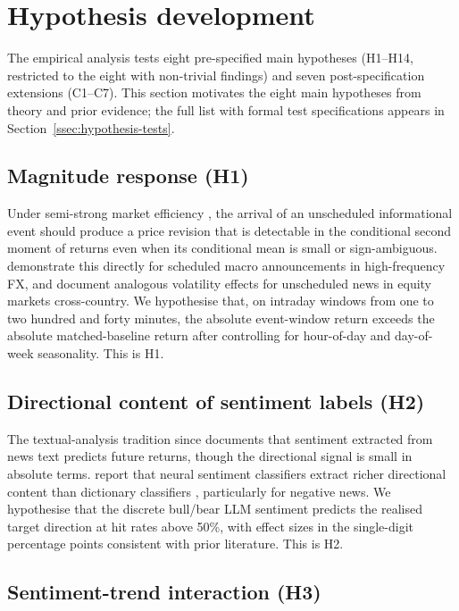 \section{Hypothesis development}
\label{sec:hypotheses}

The empirical analysis tests eight pre-specified main hypotheses
(H1--H14, restricted to the eight with non-trivial findings) and
seven post-specification extensions (C1--C7). This section motivates
the eight main hypotheses from theory and prior evidence; the full
list with formal test specifications appears in
Section~\ref{ssec:hypothesis-tests}.

\subsection{Magnitude response (H1)}

Under semi-strong market efficiency \citep{fama1970efficient}, the
arrival of an unscheduled informational event should produce a
price revision that is detectable in the conditional second moment
of returns even when its conditional mean is small or sign-ambiguous.
\citet{andersen2003micro} demonstrate this directly for scheduled
macro announcements in high-frequency FX, and
\citet{calomiris2019news} document analogous volatility effects for
unscheduled news in equity markets cross-country. We hypothesise
that, on intraday windows from one to two hundred and forty
minutes, the absolute event-window return exceeds the absolute
matched-baseline return after controlling for hour-of-day and
day-of-week seasonality. This is H1.

\subsection{Directional content of sentiment labels (H2)}

The textual-analysis tradition since \citet{tetlock2007giving}
documents that sentiment extracted from news text predicts future
returns, though the directional signal is small in absolute terms.
\citet{heston2017news} report that neural sentiment classifiers
extract richer directional content than dictionary classifiers
\citep{loughran2011liability}, particularly for negative news. We
hypothesise that the discrete bull/bear LLM sentiment predicts the
realised target direction at hit rates above 50\%, with effect sizes
in the single-digit percentage points consistent with prior
literature. This is H2.

\subsection{Sentiment-trend interaction (H3)}

